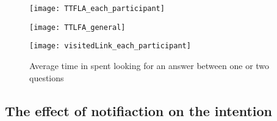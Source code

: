 \begin{figure}[!h]
\centering
\begin{minipage}{.5\textwidth}
  \centering
  \texttt{[image: TTFLA\_each\_participant]}
  \captionsetup{justification=centering}
  \label{fig:TTFA_oneTwoQues}
\end{minipage}%
\begin{minipage}{.5\textwidth}
  \centering
  \texttt{[image: TTLFA\_general]}
  \captionsetup{justification=centering}
  \label{fig:TTLFA_oneTwoQuesGeneral}
\end{minipage}
\end{figure}


\begin{figure}[!h]
\begin{center}
\texttt{[image: visitedLink\_each\_participant]}
\end{center}
\captionsetup{justification=centering}
\caption{Average time in spent looking for an answer between one or two questions}
\label{fig:lookingAnswer_oneOrTwo}
\end{figure}





\subsection{The effect of notifiaction on the intention}
